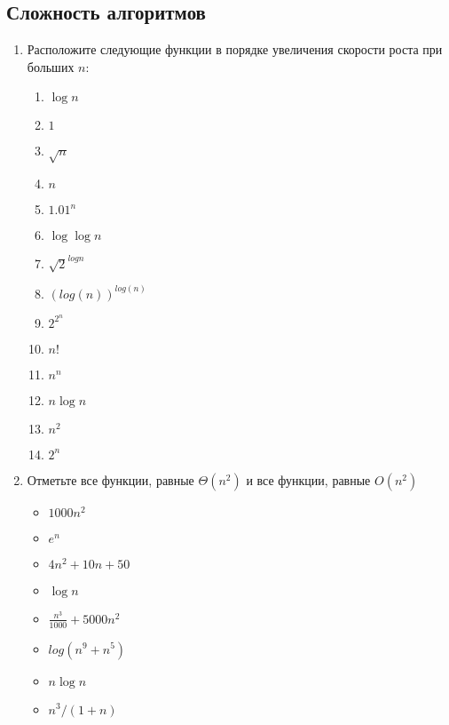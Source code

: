 \documentclass{article}
\begin{document}

\newpage

\subsection*{Сложность алгоритмов}
\begin{enumerate}

\item Расположите следующие функции в порядке увеличения скорости роста при больших $n$:
\begin{multicols}{3}
\begin{enumerate}
\item $\log{n}$
\item $1$
\item $\sqrt{n}$
\item $n$
\item $1.01^n$
\item $\log{\log{n}}$
\item $\sqrt{2}^{log n}$
\item $(log (n))^{log(n)}$
\item $2^{2^n}$
\item $n!$
\item $n^n$
\item $n\log{n}$
\item $n^2$
\item $2^n$
\end{enumerate}
\end{multicols}

\item Отметьте все функции, равные $\Theta(n^2)$ и все функции, равные $O(n^2)$
\begin{multicols}{2}
\begin{itemize}
\item $1000 n^2$
\item $e^n$
\item $4 n^2 + 10 n + 50$
\item $\log{n}$
\item $\frac{n^3}{1000} + 5000 n^2$
\item $log(n^9 + n^5)$
\item $n\log{n}$
\item $n^3 / (1 + n)$
\end{itemize}
\end{multicols}



\end{enumerate}
\end{document}

